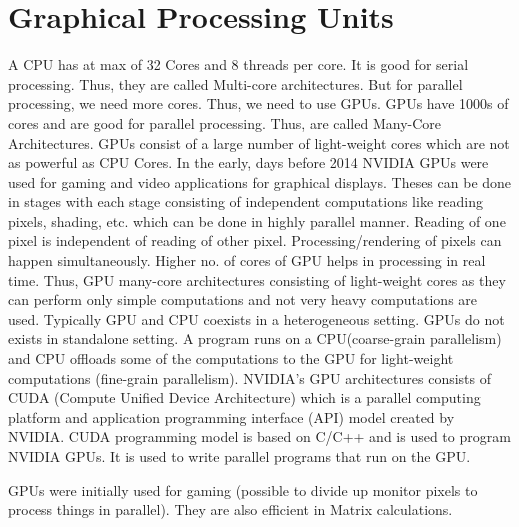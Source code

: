 \documentclass[12pt]{book}
\begin{document}
\newpage

\section{Graphical Processing Units}
A CPU has at max of 32 Cores and 8 threads per core. It is good for serial processing. Thus, they are called Multi-core architectures.
But for parallel processing, we need more cores. Thus, we need to use GPUs. GPUs have 1000s of cores and are good for parallel processing. Thus, are called Many-Core Architectures.
GPUs consist of a large number of light-weight cores which are not as powerful as CPU Cores. In the early, days before 2014 NVIDIA GPUs were used for gaming and video applications for graphical 
displays. Theses can be done in stages with each stage consisting of independent computations like reading pixels, shading, etc. which can be done in highly parallel manner. Reading of one pixel is 
independent of reading of other pixel. Processing/rendering of pixels can happen simultaneously. Higher no. of cores of GPU helps in processing in real time. Thus,
GPU many-core architectures consisting of light-weight cores as they can perform only simple computations and not very heavy computations are used.
Typically GPU and CPU coexists in a heterogeneous setting. GPUs do not exists in standalone setting. 
A program runs on a CPU(coarse-grain parallelism) and CPU offloads some of the computations to the GPU for light-weight computations (fine-grain parallelism).
NVIDIA's GPU architectures consists of CUDA (Compute Unified Device Architecture) which is a parallel computing platform and application programming interface (API) model created by NVIDIA.
CUDA programming model is based on C/C++ and is used to program NVIDIA GPUs. It is used to write parallel programs that run on the GPU.

GPUs were initially used for gaming (possible to divide up monitor pixels to process 
things in parallel). They are also efficient in Matrix calculations.
\end{document}
